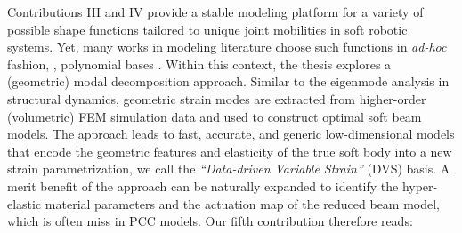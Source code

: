 Contributions III and IV provide a stable modeling platform for a variety of possible shape functions tailored to unique joint mobilities in soft robotic systems. Yet, many works in modeling literature choose such functions in \textit{ad-hoc} fashion, \eg, polynomial bases \cite{DellaSantina2020,Boyer2021,Chirikjian1991}. Within this context, the thesis explores a (geometric) modal decomposition approach. Similar to the eigenmode analysis in structural dynamics, geometric strain modes are extracted from higher-order (volumetric) FEM simulation data and used to construct optimal soft beam models. The approach leads to fast, accurate, and generic low-dimensional models that encode the geometric features and elasticity of the true soft body into a new strain parametrization, we call the \textit{``Data-driven Variable Strain''} (DVS) basis. A merit benefit of the approach can be naturally expanded to identify the hyper-elastic material parameters and the actuation map of the reduced beam model, which is often miss in PCC models. Our fifth contribution therefore reads: %
 

